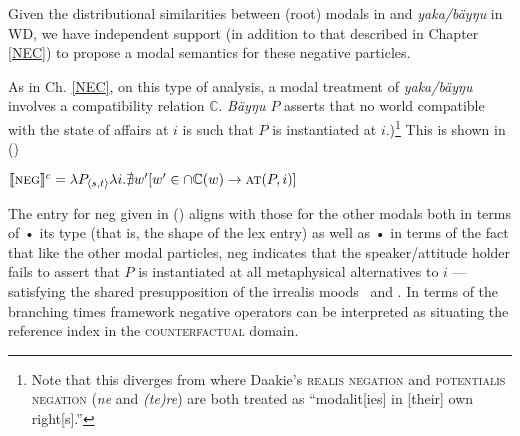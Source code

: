 Given the distributional similarities between (root) modals in and \textit{yaka/bäyŋu} in WD, we have independent support (in addition to that described in Chapter \ref{NEC}) to propose a modal semantics for these negative particles.


As in Ch. \ref{NEC}, on this type of analysis, a modal treatment of \textit{yaka/bäyŋu} involves a compatibility relation $ \mathbb C $. \textit{Bäyŋu $ P $} asserts that no world compatible with the state of affairs at $ i $ is such that $ P$ is instantiated at $ i $.)\footnote{Note that this diverges from \citet{Krifka2015,Krifka2016} where Daakie's \textsc{realis negation} and \textsc{potentialis negation} (\textit{ne} and \textit{\textit{(te)re}}) are both treated as ``modalit[ies] in [their] own right[s].''} This is shown in (\nextx)

\pex
$ \denote[c]{\textsc{neg}} = \lambda P_{\langle s,t\rangle}\lambda i. \nexists w'[w'\in\cap\mathbb C(w)\to\textsc{at}(P,i)] $
\xe

The entry for \gls{neg} given in (\lastx) aligns with those for the other modals both in terms of • its type (that is, the shape of the lex entry) as well as • in terms of the fact that like the other modal particles, \gls{neg} indicates that the speaker/attitude holder fails to assert that $ P $ is instantiated at all metaphysical alternatives to $ i $ --- satisfying the shared presupposition of the irrealis moods \II~and \IV. In terms of the branching times framework negative operators can be interpreted as situating the reference index in the \textsc{counterfactual} domain.







